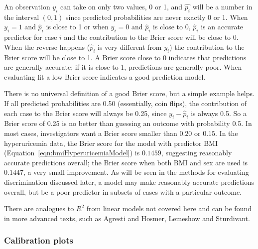 An observation $y_i$ can take on only two values, 0 or 1, and $\hat{p_i}$ will be a number in the interval $(0,1)$ since predicted probabilities are never exactly 0 or 1.  When $y_i = 1$ and $\hat{p}_i$ is close to 1 or when $y_i = 0$ and  $\hat{p}_i$ is close to 0, $\hat{p}_i$ is an accurate predictor for case $i$ and the contribution to the Brier score will be close to 0.  When the reverse happens ($\hat{p}_i$ is very different from $y_i$) the contribution to the Brier score will be close to 1.  A Brier score close to 0 indicates that predictions are generally accurate; if it is close to 1, predictions are generally poor.  When evaluating fit a low Brier score indicates a good prediction model.

There is no universal definition of a good Brier score, but a simple example helps.  If all predicted probabilities are 0.50 (essentially, coin flips), the contribution of each case to the Brier score will always be 0.25, since $y_i - \hat{p}_i$ is always 0.5.  So a Brier score of 0.25 is no better than guessing an outcome with probability 0.5.  In most cases, investigators want a Brier score smaller than $0.20$ or $0.15$.  In the hyperuricemia data, the Brier score for the model with predictor BMI (Equation~\ref{eqn:bmiHyperuricemiaModel}) is $0.1459$, suggesting reasonably accurate predictions overall; the Brier score when both BMI and sex are used is $0.1447$, a very small improvement.  As will be seen in the methods for evaluating discrimination discussed later,  a model may make reasonably accurate predictions overall, but be a poor predictor in subsets of cases with a particular outcome.

There are analogues to $R^2$ from linear models not covered here and can be found in more advanced texts, such as Agresti and Hosmer, Lemeshow and Sturdivant.

\subsubsection{Calibration plots}

